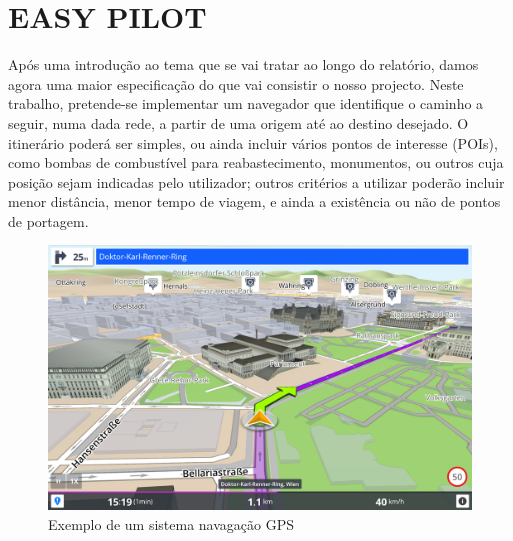 \documentclass[a4paper]{article}
\begin{document}
\section{EASY PILOT}
\begin{small}
Após uma introdução ao tema que se vai tratar ao longo do relatório, damos agora uma maior especificação do que vai consistir o nosso projecto. Neste trabalho, pretende-se implementar um navegador que identifique o caminho a seguir, numa dada rede, a partir de uma origem até ao destino desejado. O itinerário poderá ser simples, ou ainda incluir vários pontos de interesse (POIs), como bombas de combustível para reabastecimento, monumentos, ou outros cuja posição sejam indicadas pelo utilizador; outros critérios a utilizar poderão incluir menor distância, menor tempo de viagem, e ainda a existência ou não de pontos de portagem. 
\end{small}

\begin{figure}[H]
\includegraphics[scale = 0.15]{./GPS.png}
\centering
\caption{Exemplo de um sistema navagação GPS}
\end{figure}
\end{document}
